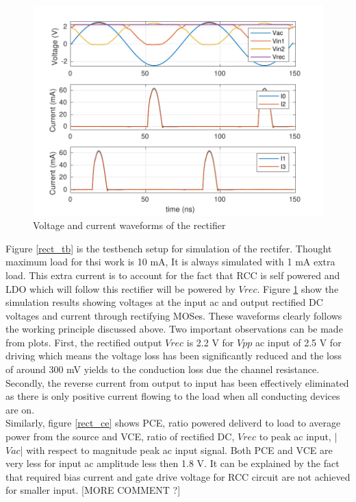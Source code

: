 \documentclass[12pt,a4paper,UKenglish]{article}
\begin{document}
\begin{figure}[htbp] %
   \centering
   \includegraphics[width=.9\textwidth]{img/rectifier_VI.pdf} 
   \caption{Voltage and current waveforms of the rectifier}
   \label{rect_plot}
\end{figure}

Figure \ref{rect_tb} is the testbench setup for simulation of the rectifer. Thought maximum load for thsi work is 10 mA, 
It is always simulated with 1 mA extra load. This extra current is to 
account for the fact that RCC is self powered and LDO which will follow this rectifier will be powered by $Vrec$. Figure \ref{rect_plot} show the simulation results showing voltages at the input ac and output rectified DC 
voltages and current through rectifying MOSes. These  
waveforms clearly follows the working principle discussed above. Two important observations can be made from 
plots. First, the rectified output $Vrec$ is 2.2 V for $Vpp$ ac input of 2.5 V for driving which means the 
voltage loss has been significantly reduced and the loss of around 300 mV yields to the conduction loss due 
the channel resistance. Secondly, the reverse current from output to input has been effectively eliminated as 
there is only positive current flowing to the load when all conducting devices 
are on.  \\

Similarly, figure  \ref{rect_ce} shows PCE, ratio powered deliverd to load to average power from the source and 
VCE, ratio of rectified DC, $Vrec$ to peak ac input, |$Vac$| with respect to magnitude peak ac input signal. Both 
PCE and VCE are very less for input ac amplitude less then 1.8 V. It can be explained by the fact that required 
bias current and gate drive voltage for RCC circuit are not achieved for smaller input. [MORE COMMENT ?]
\end{document}
